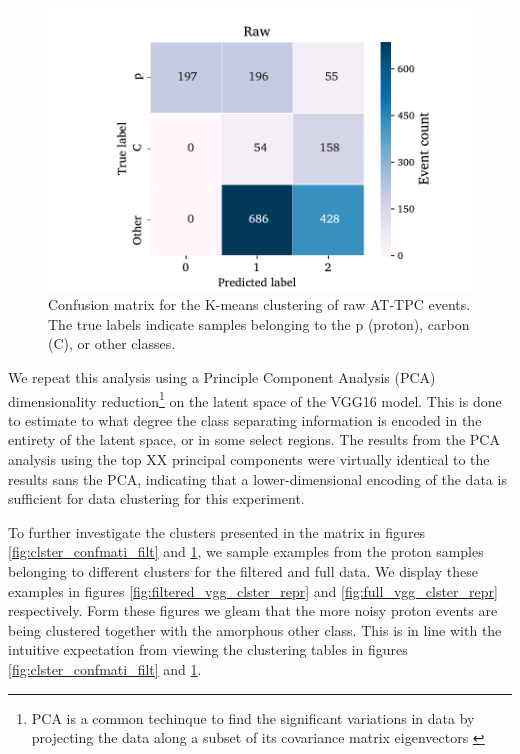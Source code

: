\documentclass[review,number,sort&compress]{elsarticle}
\begin{document}
\begin{figure}
	\includegraphics[width=\textwidth]{custom_work/Rawvgg_conf_mat.pdf}
\caption[Pre-trained network - confusion matrices]{Confusion matrix for the K-means clustering of raw AT-TPC events. The true labels indicate samples belonging to the p (proton), carbon (C), or other classes. }\label{fig:clster_confmati_raw}
\end{figure}


We repeat this analysis using a Principle Component Analysis (PCA) dimensionality reduction\footnote{
PCA is a common techinque to find the significant variations in data by projecting the data along a subset of its covariance matrix eigenvectors \cite{Marsland2009}
} on the latent space of the VGG16 model. This is done to estimate to what degree the class separating information is encoded in the entirety of the latent space, or in some select regions. The results from the PCA analysis {\color{blue} using the top XX principal components} were virtually identical to the results sans the PCA, indicating that a lower-dimensional encoding of the data is sufficient for data clustering for this experiment.

To further investigate the clusters presented in the matrix in figures \ref{fig:clster_confmati_filt} and \ref{fig:clster_confmati_raw}, we sample examples from the proton samples belonging to different clusters for the filtered and full data.
We display these examples in figures \ref{fig:filtered_vgg_clster_repr} and \ref{fig:full_vgg_clster_repr} respectively. Form these figures we gleam that the more noisy proton events are being clustered together with the amorphous other class. This is in line with the intuitive expectation from viewing the clustering tables in figures \ref{fig:clster_confmati_filt} and \ref{fig:clster_confmati_raw}.
\end{document}
